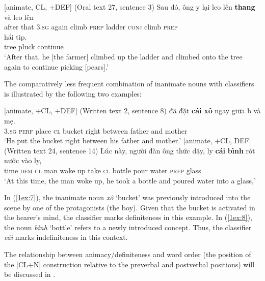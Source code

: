 \documentclass[output=paper]{langsci/langscibook}
\begin{document}
\begin{exe}
\ex\label{1ex:6}
[\minus animate, \minus CL, +DEF] (Oral text 27, sentence 3)
\exi{}
\gll Sau    đó,  {ông {\daa}y}  lại     leo     lên       {\textbf{thang}}   và       leo     lên       \\
after that  3.{\textsc{sg}}     again climb {\textsc{prep}} ladder   {\textsc{conj}} climb {\textsc{prep}}  \\
\glt
\exi{}
  hái     ti{\dae}p. \\
tree  pluck continue \\
\glt `After that, he [the farmer] climbed up the ladder and climbed onto the tree again to continue picking [pears].'
\end{exe}

The comparatively less frequent combination of inanimate nouns with classifiers is illustrated by the following two examples:

\begin{exe}
\ex\label{1ex:7}
[\minus animate, +CL, +DEF] (Written text 2, sentence 8)
\exi{}
  đã     đặt   {\textbf{cái}}  {\textbf{xô}}      ngay  giữa   b{\dao}    và   mẹ.  \\
3.{\textsc{sg}}   {\textsc{perf}}  place  {\textsc{cl}}  bucket  right  between father and  mother  \\
\glt `He put the bucket right between his father and mother.'
\ex\label{1ex:8}
[\minus animate, +CL, \minus DEF] (Written text 24, sentence 14)
\exi{}
\gll Lúc  này,   người {đàn ông} thức  dậy, l{\daa}y  {\textbf{cái}}  {\textbf{bình}}  rót     nước  vào      ly, \\
time {\textsc{dem}} {\textsc{cl}}     man       wake up   take {\textsc{cl}} bottle pour  water {\textsc{prep}}  glass \\
\glt `At this time, the man woke up, he took a bottle and poured water into a glass,'
\end{exe}

In (\ref{1ex:7}), the inanimate noun {\emph{xô}} `bucket' was previously introduced into the scene by one of the protagonists (the boy). Given that the bucket is activated in the hearer's mind, the classifier marks definiteness in this example. In (\ref{1ex:8}), the noun {\emph{bình}} `bottle' refers to a newly introduced concept. Thus, the classifier {\emph{cái}} marks indefiniteness in this context.

The relationship between animacy/definiteness and word order (the position of the [CL+N] construction relative to the preverbal and postverbal positions) will be discussed in .
\end{document}
